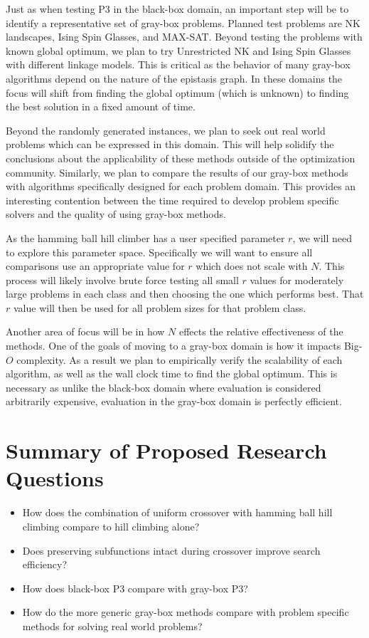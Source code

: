 Just as when testing P3 in the black-box domain, an important step will be to identify a representative set
of gray-box problems. Planned test problems are NK landscapes, Ising Spin Glasses, and MAX-SAT. Beyond testing the
problems with known global optimum, we plan to try Unrestricted NK and Ising Spin Glasses with different linkage models.
This is critical as the behavior of many gray-box algorithms depend on the nature of the epistasis graph. In these domains
the focus will shift from finding the global optimum (which is unknown) to finding the best solution in a fixed amount of time.

Beyond the randomly generated instances, we plan to seek out real world problems which can be expressed in this domain.
This will help solidify the conclusions about the applicability of these methods outside of the optimization community.
Similarly, we plan to compare the results of our gray-box methods with algorithms specifically designed for each problem
domain. This provides an interesting contention between the time required to develop problem specific solvers and the
quality of using gray-box methods.

As the hamming ball hill climber has a user specified parameter $r$, we will need to explore this parameter space.
Specifically we will want to ensure all comparisons use an appropriate value for $r$ which does not scale with
$N$. This process will likely involve brute force testing all small $r$ values for moderately large problems in each class
and then choosing the one which performs best. That $r$ value will then be used for all problem sizes for that problem class.

Another area of focus will be in how $N$ effects the relative effectiveness of the methods. One of the goals of moving
to a gray-box domain is how it impacts Big-$O$ complexity. As a result we plan to empirically verify the scalability
of each algorithm, as well as the wall clock time to find the global optimum. This is necessary as unlike the black-box
domain where evaluation is considered arbitrarily expensive, evaluation in the gray-box domain is perfectly efficient.

\section{Summary of Proposed Research Questions}
\begin{itemize}
\item How does the combination of uniform crossover with hamming ball hill climbing compare to hill climbing alone?
\item Does preserving subfunctions intact during crossover improve search efficiency?
\item How does black-box P3 compare with gray-box P3?
\item How do the more generic gray-box methods compare with problem specific methods for solving real world problems?
\end{itemize}
